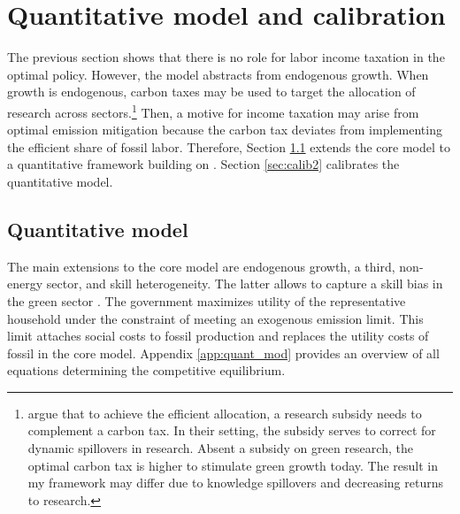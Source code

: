 \section{Quantitative model and calibration}\label{sec:model2}

The previous section shows that there is no role for labor income taxation in the optimal policy. However, the model abstracts from endogenous growth. When growth is endogenous, carbon taxes may be used to target the allocation of research across sectors.\footnote{ \cite{Acemoglu2012TheChange} argue that to achieve the efficient allocation, a research subsidy needs to complement a carbon tax. In their setting, the subsidy serves to correct for dynamic spillovers in research. Absent a subsidy on green research, the optimal carbon tax is higher to stimulate green growth today. The result in my framework may differ due to knowledge spillovers and decreasing returns to research. } Then, a motive for income taxation may arise from optimal emission mitigation because the carbon tax deviates from implementing the efficient share of fossil labor. 
Therefore, Section \ref{sec_quantmod} extends the core model to a quantitative framework building on \cite{Fried2018ClimateAnalysis}. Section \ref{sec:calib2} calibrates the quantitative model. 

\subsection{Quantitative model}\label{sec_quantmod}


The main extensions to the core model are endogenous growth, a third, non-energy sector, and skill heterogeneity. The latter allows to capture a skill bias in the green sector \citep{Consoli2016DoCapital}. 
The government maximizes utility of the representative household under the constraint of meeting an exogenous emission limit. This limit attaches social costs to fossil production and replaces the utility costs of fossil in the core model. 
Appendix \ref{app:quant_mod} provides an overview of all equations determining the competitive equilibrium.

